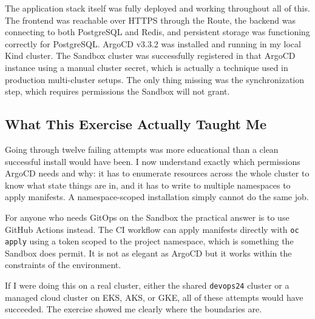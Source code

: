The application stack itself was fully deployed and working throughout all of this. The
frontend was reachable over HTTPS through the Route, the backend was connecting to both
PostgreSQL and Redis, and persistent storage was functioning correctly for PostgreSQL.
ArgoCD v3.3.2 was installed and running in my local Kind cluster. The Sandbox cluster
was successfully registered in that ArgoCD instance using a manual cluster secret, which
is actually a technique used in production multi-cluster setups. The only thing missing
was the synchronization step, which requires permissions the Sandbox will not grant.

\subsection{What This Exercise Actually Taught Me}

Going through twelve failing attempts was more educational than a clean successful
install would have been. I now understand exactly which permissions ArgoCD needs and
why: it has to enumerate resources across the whole cluster to know what state things
are in, and it has to write to multiple namespaces to apply manifests. A namespace-scoped
installation simply cannot do the same job.

For anyone who needs GitOps on the Sandbox the practical answer is to use GitHub Actions
instead. The CI workflow can apply manifests directly with \texttt{oc apply} using a
token scoped to the project namespace, which is something the Sandbox does permit. It is
not as elegant as ArgoCD but it works within the constraints of the environment.

If I were doing this on a real cluster, either the shared \texttt{devops24} cluster or
a managed cloud cluster on EKS, AKS, or GKE, all of these attempts would have
succeeded. The exercise showed me clearly where the boundaries are.
